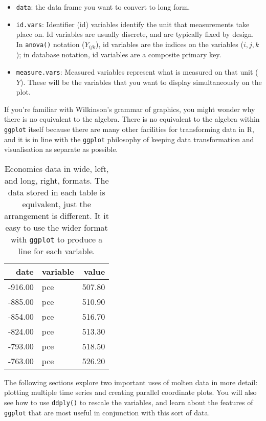 \begin{itemize}
\itemsep1pt\parskip0pt
\item
  \texttt{data}: the data frame you want to convert to long form.
\item
  \texttt{id.vars}: Identifier (id) variables identify the unit that
  measurements take place on. Id variables are usually discrete, and are
  typically fixed by design. In \texttt{anova()} notation ($Y_{ijk}$),
  id variables are the indices on the variables ($i, j, k$); in database
  notation, id variables are a composite primary key.
\item
  \texttt{measure.vars}: Measured variables represent what is measured
  on that unit ($Y$). These will be the variables that you want to
  display simultaneously on the plot.
\end{itemize}

If you're familiar with Wilkinson's grammar of graphics, you might
wonder why there is no equivalent to the algebra. There is no equivalent
to the algebra within \texttt{ggplot} itself because there are many
other facilities for transforming data in R, and it is in line with the
\texttt{ggplot} philosophy of keeping data transformation and
visualisation as separate as possible.

\begin{table}[ht]
\centering
\begin{tabular}{rlr}
  \hline
date & variable & value \\ 
  \hline
-916.00 & pce & 507.80 \\ 
  -885.00 & pce & 510.90 \\ 
  -854.00 & pce & 516.70 \\ 
  -824.00 & pce & 513.30 \\ 
  -793.00 & pce & 518.50 \\ 
  -763.00 & pce & 526.20 \\ 
   \hline
\end{tabular}
\caption{Economics data in wide, left, and long, right, formats. The data stored in each table is equivalent, just the arrangement is different. It it easy to use the wider format with \texttt{ggplot} to produce a line for each variable.} 
\label{melt}
\end{table}

The following sections explore two important uses of molten data in more
detail: plotting multiple time series and creating parallel coordinate
plots. You will also see how to use \texttt{ddply()} to rescale the
variables, and learn about the features of \texttt{ggplot} that are most
useful in conjunction with this sort of data.

